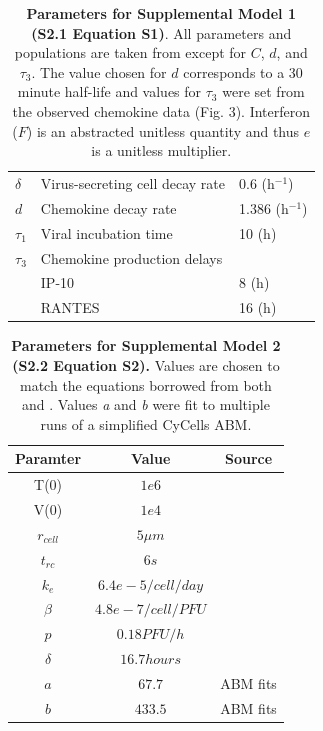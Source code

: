 \documentclass[10pt]{article}
\begin{document}
\begin{table}[!ht]
\begin{center}
\begin{tabular}{|  l  l  l  |}
  $\delta$ & Virus-secreting cell decay rate & 0.6 (h$^{-1}$) \\
  $d$ & Chemokine decay rate & 1.386 (h$^{-1}$) \\
  $\tau_1$ & Viral incubation time & 10 (h) \\
  $\tau_3$ & Chemokine production delays & \\
    & \hspace{2em} IP-10 & 8 (h)\\
    & \hspace{2em} RANTES & 16 (h)\\
  \hline
\end{tabular}
\caption{\textbf{Parameters for Supplemental Model 1 (S2.1 Equation S1)}.  All parameters and populations are taken from \cite{Mitchell2011} except for $C$, $d$, and $\tau_3$.  The value chosen for $d$ corresponds to a 30 minute half-life and values for $\tau_3$ were set from the observed chemokine data (Fig. 3).  Interferon ($F$) is an abstracted unitless quantity and thus $e$ is a unitless multiplier.}
\label{tab:dde}
\end{center}
\end{table}


\begin{table}[!ht]
\begin{center}
\begin{tabular}{ | c | c | c | }
  \hline                        
  Paramter & Value & Source \\
  \hline
  T(0) & $1e6$ & \cite{Mitchell2011} \\
  V(0) &  $1e4$ & \cite{Mitchell2011} \\
  $r_{cell}$ &  $5 \mu m$ & \cite{Miao2010} \\
  $t_{rc}$ & $6s$ & \cite{Peters1983} \\
  $k_e$ & $6.4e-5/cell/day$ & \cite{Miao2010} \\
  $\beta$ & $4.8e-7/cell/PFU$ & \cite{Mitchell2011} \\
  $p$ & $0.18 PFU/h$ & \cite{Mitchell2011} \\
  $\delta$ & $16.7 hours$ & \cite{Mitchell2011} \\
  $a$ & $67.7$ & ABM fits \\
  $b$ & $433.5$ & ABM fits \\
  \hline  
\end{tabular}
\caption{\textbf{Parameters for Supplemental Model 2 (S2.2 Equation S2).}  Values are chosen to match the equations borrowed from both \cite{Mitchell2011} and \cite{Miao2010}.  Values \textit{a} and \textit{b} were fit to multiple runs of a simplified CyCells ABM.}
\label{tab:supplement}
\end{center}
\end{table}
\end{document}
